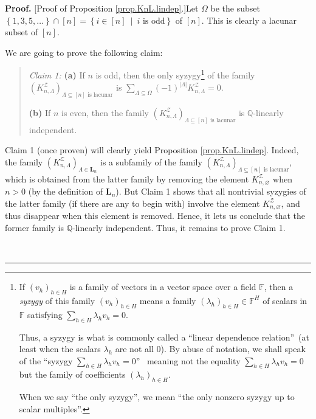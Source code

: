 \documentclass[numbers=enddot,12pt,final,onecolumn,notitlepage]{scrartcl}%
\theoremstyle{definition}
\newenvironment{statement}{\begin{quote}}{\end{quote}}
\newenvironment{proof}[1][Proof]{\noindent\textbf{#1.} }{\ \rule{0.5em}{0.5em}}
\let\sumnonlimits\sum
\renewcommand{\sum}{\sumnonlimits\limits}
\begin{document}
\begin{proof}
[Proof of Proposition \ref{prop.KnL.lindep}.]Let $\Omega$ be the subset
$\left\{  1,3,5,\ldots\right\}  \cap\left[  n\right]  =\left\{  i\in\left[
n\right]  \ \mid\ i\text{ is odd}\right\}  $ of $\left[  n\right]  $. This is
clearly a lacunar subset of $\left[  n\right]  $.

We are going to prove the following claim:

\begin{statement}
\textit{Claim 1:} \textbf{(a)} If $n$ is odd, then the only syzygy\footnote{If
$\left(  v_{h}\right)  _{h\in H}$ is a family of vectors in a vector space
over a field $\mathbb{F}$, then a \textit{syzygy} of this family $\left(
v_{h}\right)  _{h\in H}$ means a family $\left(  \lambda_{h}\right)  _{h\in
H}\in\mathbb{F}^{H}$ of scalars in $\mathbb{F}$ satisfying $\sum_{h\in
H}\lambda_{h}v_{h}=0$.
\par
Thus, a syzygy is what is commonly called a \textquotedblleft linear
dependence relation\textquotedblright\ (at least when the scalars $\lambda
_{h}$ are not all $0$). By abuse of notation, we shall speak of the
\textquotedblleft syzygy $\sum_{h\in H}\lambda_{h}v_{h}=0$\textquotedblright%
\ meaning not the equality $\sum_{h\in H}\lambda_{h}v_{h}=0$ but the family of
coefficients $\left(  \lambda_{h}\right)  _{h\in H}$.
\par
When we say \textquotedblleft the only syzygy\textquotedblright, we mean
\textquotedblleft the only nonzero syzygy up to scalar
multiples\textquotedblright.} of the family
$\left(  K_{n,\Lambda }^{\mathcal{Z}}\right) %
_{\Lambda\subseteq\left[  n\right]  \text{ is lacunar}}$
is $\sum_{\Lambda\subseteq\Omega}\left(  -1\right)  ^{\left\vert
\Lambda\right\vert }K_{n,\Lambda}^{\mathcal{Z}}=0$.

\textbf{(b)} If $n$ is even, then the family $\left(  K_{n,\Lambda
}^{\mathcal{Z}}\right)  _{\Lambda\subseteq\left[  n\right]  \text{ is
lacunar}}$ is $\mathbb{Q}$-linearly independent.
\end{statement}

Claim 1 (once proven) will clearly yield
Proposition \ref{prop.KnL.lindep}. Indeed, the family
$\left(  K_{n,\Lambda}^{\mathcal{Z}}\right)  _{\Lambda\in \mathbf{L}_n}$
is a subfamily of the family
$\left(  K_{n,\Lambda }^{\mathcal{Z}}\right) %
_{\Lambda\subseteq\left[  n\right]  \text{ is lacunar}}$,
which is obtained from the latter family by removing the element
$K_{n,\varnothing}^{\mathcal{Z}}$ when $n > 0$ (by the definition
of $\mathbf{L}_n$).
But Claim 1 shows that all nontrivial syzygies of the latter family
(if there are any to begin with) involve the element
$K_{n,\varnothing}^{\mathcal{Z}}$, and thus disappear when this
element is removed.
Hence, it lets us conclude that the former family is
$\mathbb{Q}$-linearly independent.
Thus, it remains to prove Claim 1.


\end{proof}
\end{document}

